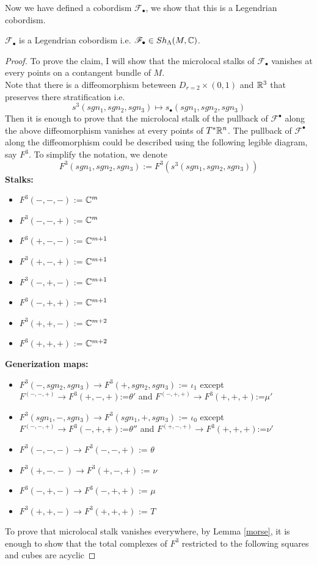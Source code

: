 Now we have defined a cobordism $\mathscr{F}_\bullet$, we show that this is a Legendrian cobordism.
\begin{proposition}
$\mathscr{F}_\bullet$ is a Legendrian cobordism i.e. $\mathscr{F}_\bullet \in Sh_\Lambda(M,\mathbb{C})$.
\end{proposition}
\begin{proof}
To prove the claim, I will show that the microlocal stalks of $\mathscr{F}_\bullet$ vanishes at every points on a contangent bundle of $M$.\\
Note that there is a diffeomorphism beteween $D_{r=2} \times (0,1)$ and $\mathbb{R}^3$ that preserves there stratification i.e.
\[
s^3(sgn_1,sgn_2,sgn_3) \mapsto s_\bullet(sgn_1,sgn_2,sgn_3)
\]
Then it is enough to prove that the microlocal stalk of the pullback of $\mathscr{F}^\bullet$ along the above diffeomorphism vanishes at every points of $T^*\mathbb{R}^n$. The pullback of $\mathscr{F}^\bullet$ along the diffeomorphism could be described using the following legible diagram, say $F^3$. To simplify the notation, we denote
\[
F^3(sgn_1,sgn_2,sgn_3):= F^3(s^3(sgn_1,sgn_2,sgn_3))
\]
\textbf{Stalks:}
\begin{itemize}
\item $F^3(-,-,-)$ := $\mathbb{C}^m$
\item $F^3(-,-,+)$ := $\mathbb{C}^m$
\item $F^3(+,-,-)$ := $\mathbb{C}^{m+1}$
\item $F^3(+,-,+)$ := $\mathbb{C}^{m+1}$
\item $F^3(-,+,-)$ := $\mathbb{C}^{m+1}$
\item $F^3(-,+,+)$ := $\mathbb{C}^{m+1}$
\item $F^3(+,+,-)$ := $\mathbb{C}^{m+2}$
\item $F^3(+,+,+)$ := $\mathbb{C}^{m+2}$
\end{itemize}

\textbf{Generization maps:}
\begin{itemize}
\item $F^3(-,sgn_2,sgn_3)\rightarrow F^3(+,sgn_2,sgn_3)$ := $\iota_1$
except $F^(-,-,+)\rightarrow F^3(+,-,+)$:=$\theta'$ and $F^(-,+,+)\rightarrow F^3(+,+,+)$:=$\mu'$

\item $F^3(sgn_1,-,sgn_3)\rightarrow F^3(sgn_1,+,sgn_3)$ := $\iota_0$
except $F^(-,-,+)\rightarrow F^3(-,+,+)$:=$\theta''$ and $F^(+,-,+)\rightarrow F^3(+,+,+)$:=$\nu'$

\item $F^3(-,-,-)\rightarrow F^3(-,-,+)$ := $\theta$
\item $F^3(+,-.-)\rightarrow F^3(+,-,+)$ := $\nu$
\item $F^3(-,+,-)\rightarrow F^3(-,+,+)$ := $\mu$
\item $F^3(+,+,-)\rightarrow F^3(+,+,+)$ := $T$
\end{itemize}
To prove that microlocal stalk vanishes everywhere, by Lemma \ref{morse}, it is enough to show that the total complexes of $F^3$ restricted to the following squares and cubes are acyclic


\end{proof}
